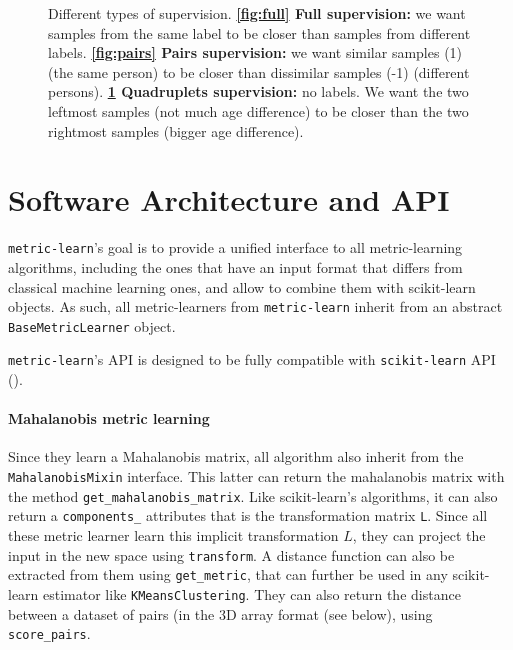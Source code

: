 \documentclass[twoside,11pt]{article}
\begin{document}
\begin{figure}[H]
\begin{subfigure}[t]{0.3\textwidth}
     
     \caption{}
     \label{fig:quadruplets}
  \end{subfigure}
  \caption{Different types of supervision. \textbf{\ref{fig:full} Full supervision:} we want samples from the same label to be closer than samples from different labels. \textbf{\ref{fig:pairs} Pairs supervision:} we want similar samples (1) (the same person) to be closer than dissimilar samples (-1) (different persons). \textbf{\ref{fig:quadruplets} Quadruplets supervision:} no labels. We want the two leftmost samples (not much age difference) to be closer than the two rightmost samples (bigger age difference).}
  \label{fig:contour}
\end{figure}

\section{Software Architecture and API}

\texttt{metric-learn}'s goal is to provide a unified interface to all metric-learning algorithms, including the ones that have an input format that differs from classical machine learning ones, and allow to combine them with scikit-learn objects. As such, all metric-learners from \texttt{metric-learn} inherit from an abstract \texttt{BaseMetricLearner} object.

\texttt{metric-learn}'s API is designed to be fully compatible with \texttt{scikit-learn} API (\cite{scikit-learn}). 

\paragraph{Mahalanobis metric learning}

Since they learn a Mahalanobis matrix, all algorithm also inherit from the \texttt{MahalanobisMixin} interface. This latter can return the mahalanobis matrix with the method \texttt{get\_mahalanobis\_matrix}. Like scikit-learn's algorithms, it can also return a \texttt{components\_} attributes that is the transformation matrix \texttt{L}. Since all these metric learner learn this implicit transformation $L$, they can project the input in the new space using \texttt{transform}. A distance function can also be extracted from them using \texttt{get\_metric}, that can further be used in any scikit-learn estimator like \texttt{KMeansClustering}. They can also return the distance between a dataset of pairs (in the 3D array format (see below), using \texttt{score\_pairs}.
\end{document}
